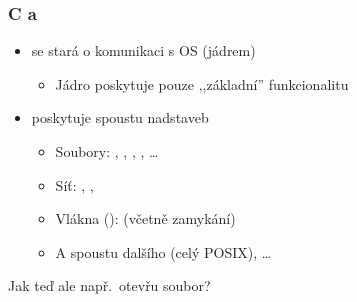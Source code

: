 \shorthandoff{-}

\begin{frame}
  \frametitle{C a }

  \begin{itemize}
    \item {} se stará o komunikaci s OS (jádrem)
    \begin{itemize}
      \item Jádro poskytuje pouze ,,základní'' funkcionalitu
    \end{itemize}

    \pause

    \item {} poskytuje spoustu nadstaveb
    \begin{itemize}
      \item Soubory: , , , ,
	\dots

      \pause

      \item Síť: , , 

      \pause

      \item Vlákna ():  (včetně zamykání)

      \pause

      \item A spoustu dalšího (celý POSIX), \dots
    \end{itemize}
  \end{itemize}

  \medskip
  \pause

  \begin{center}

    \smallskip

    Jak teď ale např.\ otevřu soubor?
  \end{center}

\end{frame}

